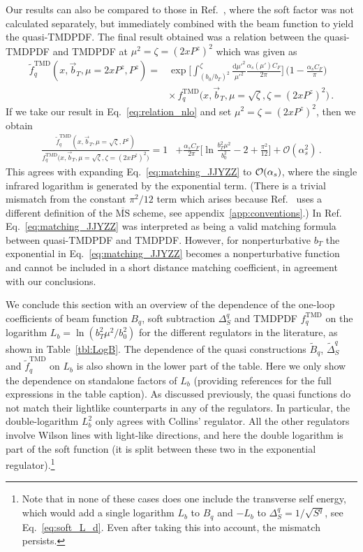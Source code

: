 \documentclass[11pt,a4paper]{article}
\DeclareRobustCommand{\eq}[1]{Eq.~\eqref{eq:#1}}
\DeclareRobustCommand{\app}[1]{appendix~\ref{app:#1}}
\DeclareRobustCommand{\tbl}[1]{Table~\ref{tbl:#1}}
\DeclareRobustCommand{\mycite}[1]{Ref.~\cite{#1}}
\newcommand{\MS}{\overline{\mathrm{MS}}}
\newcommand{\df}{\mathrm{d}}
\newcommand{\cO}{\mathcal{O}}
\newcommand{\nn}{\nonumber}
\newcommand{\as}{\alpha_s}
\newcommand\TMD{\mathrm{TMD}}
\newcommand{\Lb}[1]{\ln^{#1}\frac{b_T^2 \mu^2}{b_0^2}}
\newcommand{\bt}{\vec b_T}
\begin{document}
Our results can also be compared to those in \mycite{Ji:2018hvs},
where the soft factor was not calculated separately, but immediately combined with the beam function to yield the quasi-TMDPDF.
The final result obtained was a relation between the quasi-TMDPDF and TMDPDF at $\mu^2 = \zeta = (2xP^z)^2$ which was given as
\begin{align} \label{eq:matching_JJYZZ}
 \tilde f_{q}^\TMD (x,\bt,\mu=2xP^z, P^z) =
 &\exp\biggl[ \int_{(b_0/b_T)^2}^{\zeta} \frac{\df\mu'^2}{\mu'^2} \frac{\as(\mu') C_F}{2\pi} \biggr]
 \, \biggl(1 - \frac{\as C_F}{\pi} \biggr)
 \nn\\&\times
 \, f_{q}^\TMD\bigl(x, \bt, \mu=\sqrt\zeta, \zeta=(2xP^z)^2\bigr)
\,.\end{align}
If we take our result in \eq{relation_nlo} and set $\mu^2=\zeta=(2xP^z)^2$, then we obtain
\begin{align} \label{eq:relation_nlo_fixzeta_fixmu}
 \frac{\tilde f_{q}^{\TMD}(x, \bt, \mu=\sqrt{\zeta}, P^z)}{f_{q}^{\TMD}\big(x, \bt, \mu=\sqrt{\zeta}, \zeta\!=\!(2xP^z)^2\big)}
 = 1 &+ \frac{\as C_F}{2\pi} \biggl[ \Lb{} 
   - 2 + \frac{\pi^2}{12}
   \biggr] 
   + \cO(\as^2)
   \,.
\end{align}
This agrees with expanding \eq{matching_JJYZZ} to ${\cal O}(\alpha_s)$, where the single infrared logarithm is generated by the exponential term. (There is a
trivial mismatch from the constant $\pi^2/12$ term which arises because \mycite{Ji:2018hvs} uses a different definition of the $\MS$ scheme, see \app{conventions}.) In Ref.~\cite{Ji:2018hvs} \eq{matching_JJYZZ} was interpreted as being a valid matching formula between quasi-TMDPDF and TMDPDF.
However, for nonperturbative $b_T$ the exponential in \eq{matching_JJYZZ} becomes a nonperturbative function and cannot be included in a short distance matching coefficient, in agreement with our conclusions. 


We conclude this section with an overview of the dependence of the one-loop coefficients of beam function $B_q$, soft subtraction $\Delta_S^q$ and TMDPDF $f_q^\TMD$ on the logarithm $L_b = \ln(b_T^2 \mu^2 / b_0^2)$ for the different regulators in the literature, as shown in \tbl{LogB}. The dependence of the quasi constructions $\tilde B_q$, $\tilde\Delta_S^q$ and $\tilde f_q^\TMD$ on $L_b$ is also shown in the lower part of the table.
Here we only show the dependence on standalone factors of $L_b$ (providing references for the full expressions in the table caption). 
As discussed previously, the quasi functions do not match their lightlike counterparts in any of the regulators.
In particular, the double-logarithm $L_b^2$ only agrees with Collins' regulator. All the other regulators involve Wilson lines with light-like directions, and here the double logarithm is part of the soft function (it is split between these two in the exponential regulator).\footnote{Note that in none of these cases does one include the transverse self energy, which would add a single logarithm $L_b$ to $B_q$ and $-L_b$ to $\Delta_S^q=1/\sqrt{S^q}$, see \eq{soft_L_d}.
Even after taking this into account, the mismatch persists.}
\end{document}
